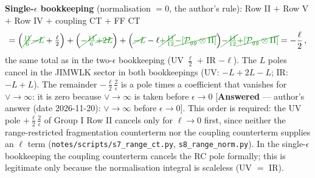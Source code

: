 \documentclass[9pt]{article}
\numberwithin{equation}{section}
\begin{document}
{\begin{center}
\begin{tabular}{|p{4.3cm}|p{3.6cm}|p{0.9cm}|p{2.9cm}|p{5.4cm}|}
\end{tabular}
\end{center}
\noindent\textbf{Single-$\epsilon$ bookkeeping} (normalisation $=0$, the author's rule): Row II $+$ Row V $+$ Row IV $+$ coupling CT $+$ FF CT
\begin{align}
=\Big({\color{green!50!black}\cancel{\tfrac{11}{6}}}{\color{green!50!black}\cancel{-L}}+\tfrac{\ell}{2}\Big)+\Big({\color{green!50!black}\cancel{-\tfrac{11}{6}}}{\color{green!50!black}\cancel{+2L}}\Big)+\Big({\color{green!50!black}\cancel{-L}}-\ell{\color{green!50!black}\cancel{+\tfrac{11}{12}}}{\color{green!50!black}\cancel{-[\mathcal{P}_{gg}\otimes\Pi]}}\Big){\color{green!50!black}\cancel{-\tfrac{11}{12}}}{\color{green!50!black}\cancel{+[\mathcal{P}_{gg}\otimes\Pi]}}=-\frac{\ell}{2}\,,\notag
\end{align}
the same total as in the two-$\epsilon$ bookkeeping (UV $\frac{\ell}{2}$ $+$ IR $-\ell$). The $L$ poles cancel in the JIMWLK sector in both bookkeepings (UV: $-L+2L-L$; IR: $-L+L$). The remainder $-\frac{\ell}{2}\frac{2}{\epsilon}$ is a pole times a coefficient that vanishes for $\vee\to\infty$: it is zero because $\vee\to\infty$ is taken before $\epsilon\to0$ [\textbf{Answered} --- author's answer (date 2026-11-20): $\vee\to\infty$ before $\epsilon\to0$]. This order is required: the UV pole $+\frac{\ell}{2}\frac{2}{\epsilon}$ of Group I Row II cancels only for $\ell\to0$ first, since neither the range-restricted fragmentation counterterm nor the coupling counterterm supplies an $\ell$ term (\texttt{notes/scripts/s7\_range\_ct.py}, \texttt{s8\_range\_norm.py}). In the single-$\epsilon$ bookkeeping the coupling counterterm cancels the RC pole formally; this is legitimate only because the normalisation integral is scaleless (UV $=$ IR).

}
\end{document}
